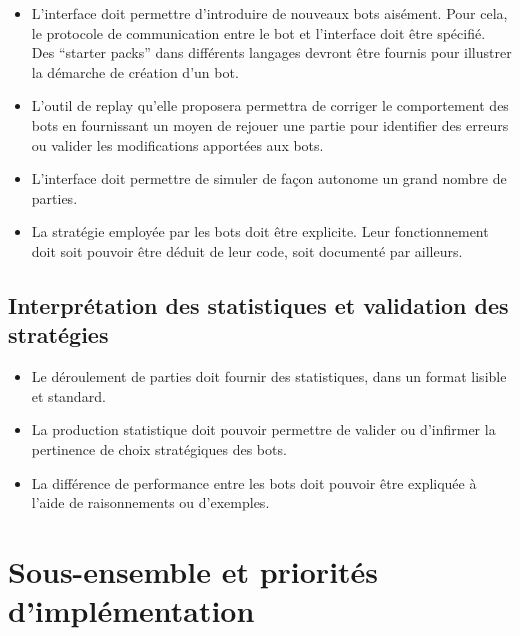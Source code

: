 \documentclass[12pt]{article}
\begin{document}
\begin{itemize}
\item L'interface doit permettre d'introduire de nouveaux bots aisément. Pour cela, le protocole de communication entre le bot et l'interface doit être spécifié. Des ``starter packs'' dans différents langages devront être fournis pour illustrer la démarche de création d'un bot.
\item L'outil de replay qu'elle proposera permettra de corriger le comportement des bots en fournissant un moyen de rejouer une partie pour identifier des erreurs ou valider les modifications apportées aux bots.
\item L'interface doit permettre de simuler de façon autonome un grand nombre de parties.
\item La stratégie employée par les bots doit être explicite. Leur fonctionnement doit soit pouvoir être déduit de leur code, soit documenté par ailleurs.
\end{itemize}

\subsection{Interprétation des statistiques et validation des stratégies}

\begin{itemize}
\item Le déroulement de parties doit fournir des statistiques, dans un format lisible et standard.
\item La production statistique doit pouvoir permettre de valider ou d'infirmer la pertinence de choix stratégiques des bots.
\item La différence de performance entre les bots doit pouvoir être expliquée à l'aide de raisonnements ou d'exemples.
\end{itemize}

\section{Sous-ensemble et priorités d'implémentation}
\end{document}
